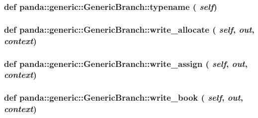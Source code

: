 \label{classpanda_1_1generic_1_1GenericBranch_aef90d8609c13cd7bd67f557746674a8c}
\hypertarget{classpanda_1_1generic_1_1GenericBranch_af78008825777e7935f92b45facbf6d54}{
\subsubsection[{typename}]{\setlength{\rightskip}{0pt plus 5cm}def panda::generic::GenericBranch::typename ( {\em self})}}
\label{classpanda_1_1generic_1_1GenericBranch_af78008825777e7935f92b45facbf6d54}
\hypertarget{classpanda_1_1generic_1_1GenericBranch_a67d440a62e13258d4731e7196db2f4f0}{
\subsubsection[{write\_\-allocate}]{\setlength{\rightskip}{0pt plus 5cm}def panda::generic::GenericBranch::write\_\-allocate ( {\em self}, \/   {\em out}, \/   {\em context})}}
\label{classpanda_1_1generic_1_1GenericBranch_a67d440a62e13258d4731e7196db2f4f0}
\hypertarget{classpanda_1_1generic_1_1GenericBranch_a4f5d6de742225769443beb17bda74a4d}{
\subsubsection[{write\_\-assign}]{\setlength{\rightskip}{0pt plus 5cm}def panda::generic::GenericBranch::write\_\-assign ( {\em self}, \/   {\em out}, \/   {\em context})}}
\label{classpanda_1_1generic_1_1GenericBranch_a4f5d6de742225769443beb17bda74a4d}
\hypertarget{classpanda_1_1generic_1_1GenericBranch_ab14b2d4bccc10621173e87c9ae95e8c2}{
\subsubsection[{write\_\-book}]{\setlength{\rightskip}{0pt plus 5cm}def panda::generic::GenericBranch::write\_\-book ( {\em self}, \/   {\em out}, \/   {\em context})}}
